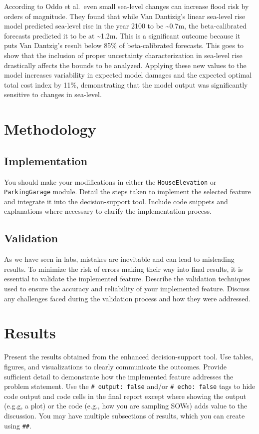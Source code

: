 \documentclass[
  11pt,
]{article}
\begin{document}
According to Oddo et al.~even small sea-level changes can increase flood
risk by orders of magnitude. They found that while Van Dantizig's linear
sea-level rise model predicted sea-level rise in the year 2100 to be
\textasciitilde0.7m, the beta-calibrated forecasts predicted it to be at
\textasciitilde1.2m. This is a significant outcome because it puts Van
Dantzig's result below 85\% of beta-calibrated forecasts. This goes to
show that the inclusion of proper uncertainty characterization in
sea-level rise drastically affects the bounds to be analyzed. Applying
these new values to the model increases variability in expected model
damages and the expected optimal total cost index by 11\%, demonstrating
that the model output was significantly sensitive to changes in
sea-level.

\section{Methodology}\label{methodology}

\subsection{Implementation}\label{implementation}

You should make your modifications in either the \texttt{HouseElevation}
or \texttt{ParkingGarage} module. Detail the steps taken to implement
the selected feature and integrate it into the decision-support tool.
Include code snippets and explanations where necessary to clarify the
implementation process.

\subsection{Validation}\label{validation}

As we have seen in labs, mistakes are inevitable and can lead to
misleading results. To minimize the risk of errors making their way into
final results, it is essential to validate the implemented feature.
Describe the validation techniques used to ensure the accuracy and
reliability of your implemented feature. Discuss any challenges faced
during the validation process and how they were addressed.

\section{Results}\label{results}

Present the results obtained from the enhanced decision-support tool.
Use tables, figures, and visualizations to clearly communicate the
outcomes. Provide sufficient detail to demonstrate how the implemented
feature addresses the problem statement. Use the
\texttt{\#\textbar{}\ output:\ false} and/or
\texttt{\#\textbar{}\ echo:\ false} tags to hide code output and code
cells in the final report except where showing the output (e.g.g, a
plot) or the code (e.g., how you are sampling SOWs) adds value to the
discussion. You may have multiple subsections of results, which you can
create using \texttt{\#\#}.
\end{document}
